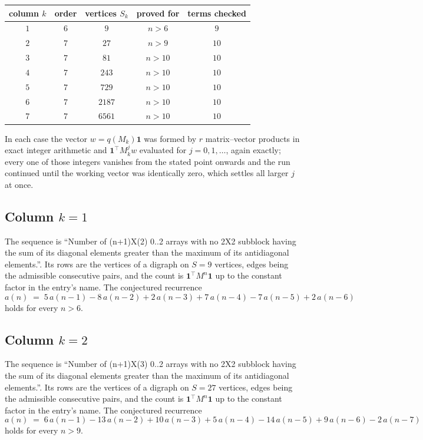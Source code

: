 \documentclass[11pt,a4paper]{article}
\theoremstyle{plain}
\theoremstyle{definition}
\begin{document}
\begin{center}
\begin{tabular}{ccccc}
column $k$ & order & vertices $S_k$ & proved for & terms checked \\ \hline
$1$ & $6$ & $9$ & $n>6$ & $9$ \\
$2$ & $7$ & $27$ & $n>9$ & $10$ \\
$3$ & $7$ & $81$ & $n>10$ & $10$ \\
$4$ & $7$ & $243$ & $n>10$ & $10$ \\
$5$ & $7$ & $729$ & $n>10$ & $10$ \\
$6$ & $7$ & $2187$ & $n>10$ & $10$ \\
$7$ & $7$ & $6561$ & $n>10$ & $10$ \\
\end{tabular}
\end{center}

In each case the vector $w=q(M_k)\mathbf{1}$ was formed by $r$ matrix--vector products in
exact integer arithmetic and $\mathbf{1}^{\!\top}M_k^{j}w$ evaluated for $j=0,1,\dots$,
again exactly; every one of those integers vanishes from the stated point onwards and the run
continued until the working vector was identically zero, which settles all larger $j$ at once.

\subsection*{Column $k=1$}
The sequence is ``Number of (n+1)X(2) 0..2 arrays with no 2X2 subblock having the sum of its diagonal elements greater than the maximum of its antidiagonal elements.''. Its rows are the vertices of a digraph on
$S=9$ vertices, edges being the admissible consecutive pairs, and the count is
$\mathbf{1}^{\!\top}M^{n}\mathbf{1}$ up to the constant factor in the entry's name.
The conjectured recurrence
\[
a(n)\;=\;5\,a(n-1) - 8\,a(n-2) + 2\,a(n-3) + 7\,a(n-4) - 7\,a(n-5) + 2\,a(n-6)
\]
holds for every $n>6$.

\subsection*{Column $k=2$}
The sequence is ``Number of (n+1)X(3) 0..2 arrays with no 2X2 subblock having the sum of its diagonal elements greater than the maximum of its antidiagonal elements.''. Its rows are the vertices of a digraph on
$S=27$ vertices, edges being the admissible consecutive pairs, and the count is
$\mathbf{1}^{\!\top}M^{n}\mathbf{1}$ up to the constant factor in the entry's name.
The conjectured recurrence
\[
a(n)\;=\;6\,a(n-1) - 13\,a(n-2) + 10\,a(n-3) + 5\,a(n-4) - 14\,a(n-5) + 9\,a(n-6) - 2\,a(n-7)
\]
holds for every $n>9$.
\end{document}
